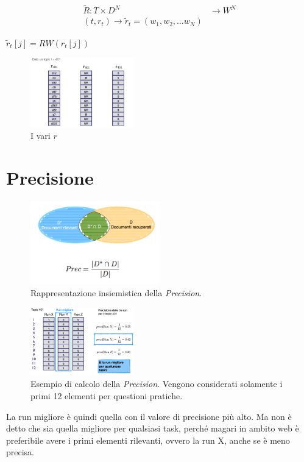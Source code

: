 \begin{align*}
	\tilde{R}: T \times D^N &\to W^N \\
				(t, r_t) \to \tilde{r}_t = (w_1, w_2, \ldots w_N)
\end{align*}

\noindent $\tilde{r}_t[j] = RW(\hat{r}_t[j])$

\begin{figure}[htbp]
	\centering
	\includegraphics[width=0.4\textwidth]{images/l14-fig-9.png}
	\caption{I vari $r$}
\end{figure}

\section{Precisione}

\begin{figure}[htbp]
	\centering
	\includegraphics[width=0.5\textwidth]{images/l14-fig-10.png}
	\caption{Rappresentazione insiemistica della \textit{Precision}.}
\end{figure}

\begin{figure}[htbp]
	\centering
	\includegraphics[width=0.4\textwidth]{images/l14-fig-11.png}
	\caption{Esempio di calcolo della \textit{Precision}. Vengono considerati solamente i primi 12 elementi per questioni pratiche.}
\end{figure}

\noindent La run migliore è quindi quella con il valore di precisione più alto. 
Ma non è detto che sia quella migliore per qualsiasi task, perché magari in ambito web è preferibile avere i primi elementi rilevanti, ovvero la run X, anche se è meno precisa.




